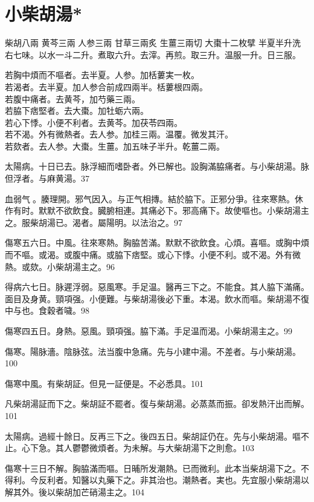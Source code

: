 \section{小柴胡湯*}

柴胡{\scriptsize 八兩} 黄芩{\scriptsize 三兩} 人参{\scriptsize 三兩} 甘草{\scriptsize 三兩炙} 生薑{\scriptsize 三兩切} 大棗{\scriptsize 十二枚擘} 半夏{\scriptsize 半升洗}\\
右七味。以水一斗二升。煮取六升。去滓。再煎。取三升。温服一升。日三服。

若胸中煩而不嘔者。去半夏。人参。加栝蔞実一枚。\\
若渴者。去半夏。加人参合前成四兩半。栝蔞根四兩。\\
若腹中痛者。去黄芩，加芍藥三兩。\\
若脇下痞堅者。去大棗。加牡蛎六兩。\\
若心下悸。小便不利者。去黄芩。加茯苓四兩。\\
若不渴。外有微熱者。去人参。加桂三兩。温覆。微发其汗。\\
若欬者。去人参。大棗。生薑。加五味子半升。乾薑二兩。

太陽病。十日已去。脉浮細而嗜卧者。外已解也。設胸滿脇痛者。与小柴胡湯。脉{\khaaitp 但}浮者。与麻黄湯。37

血弱气{\sungtpii 𥁞}。腠理開。邪气因入。与正气相摶。結於脇下。正邪分爭。往來寒熱。休作有时。默默不欲飲食。臓腑相連。其痛必下。邪高痛下。故使嘔也。小柴胡湯主之。服柴胡湯已。渴者。屬陽明。以法治之。97

傷寒五六日。中風。往來寒熱。胸脇苦滿。默默不欲飲食。心煩。喜嘔。或胸中煩而不嘔。或渴。或腹中痛。或脇下痞堅。或心下悸。小便不利。或不渴。外有微熱。或欬。小柴胡湯主之。96

得病六七日。脉遲浮弱。惡風寒。手足温。醫再三下之。不能食。其人脇下滿{\khaaitp 痛}。面目及身黄。頸項强。小便難。与柴胡湯後必下重。本渴。飲水而嘔。柴胡{\khaaitp 湯}不復中与也。食穀者噦。98

傷寒四五日。身熱。惡風。頸項强。脇下滿。手足温而渴。小柴胡湯主之。99

傷寒。陽脉濇。陰脉弦。法当腹中急痛。先与小建中湯。不差者。与小柴胡湯。100

傷寒中風。有柴胡証。但見一証便是。不必悉具。101

凡柴胡湯証而下之。柴胡証不罷者。復与柴胡湯。必蒸蒸而振。卻发熱汗出而解。101

太陽病。過經十餘日。反再三下之。後四五日。柴胡証仍在。先与小柴胡湯。嘔不止。心下急。其人鬱鬱微煩者。为未解。与大柴胡湯下之則愈。103

傷寒十三日不解。胸脇滿而嘔。日晡所发潮熱{\khaaitp 。已}而微利。此本当柴胡湯下之。不得利。今反利者。知醫以丸藥下之。非其治也。潮熱者。実也。先宜服小柴胡湯以解其外。後以柴胡加芒硝湯主之。104

